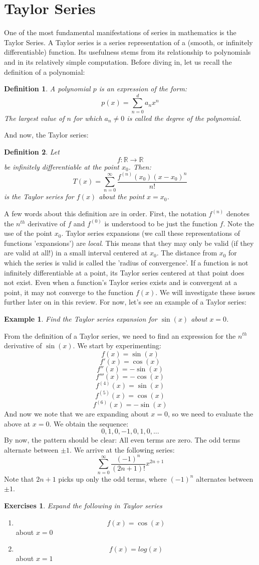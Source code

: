 \documentclass[12pt,a4paper]{article} %
\newtheorem{defn}{Definition}
\newtheorem{example}{Example}
\newtheorem{exer}{Exercises}
\begin{document}
\section{Taylor Series}
One of the most fundamental manifestations of series in mathematics is the Taylor Series.  A Taylor series is a series representation of a (smooth, or infinitely differentiable) function.  Its usefulness stems from its relationship to polynomials and in its relatively simple computation.  Before diving in, let us recall the definition of a polynomial:
\begin{defn}
A polynomial $p$ is an expression of the form:
$$p(x) = \sum_{n=0}^d a_n x^n$$
The largest value of $n$ for which $a_n\neq 0$ is called the \emph{degree} of the polynomial.
\end{defn}
And now, the Taylor series:
\begin{defn}
Let $$f:\mathbb{R}\rightarrow\mathbb{R}$$ be infinitely differentiable at the point $x_0$.  Then:
$$T(x)=\sum_{n=0}^\infty \frac{f^{(n)}(x_0)(x-x_0)^n}{n!}$$
is the Taylor series for $f(x)$ about the point $x=x_0$.  
\end{defn}
A few words about this definition are in order.  First, the notation $f^{(n)}$ denotes the $n^{th}$ derivative of $f$ and $f^{(0)}$ is understood to be just the function $f$.  Note the use of the point $x_0$.  Taylor series expansions (we call these representations of functions 'expansions') are \emph{local}.  This means that they may only be valid (if they are valid at all!) in a small interval centered at $x_0$.  The distance from $x_0$ for which the series is valid is called the 'radius of convergence'. If a function is not infinitely differentiable at a point, its Taylor series centered at that point does not exist.  Even when a function's Taylor series exists and is convergent at a point, it may not converge to the function $f(x)$.  We will investigate these issues further later on in this review.  For now, let's see an example of a Taylor series:
\begin{example}
Find the Taylor series expansion for $\sin(x)$ about $x=0$.
\end{example}
From the definition of a Taylor series, we need to find an expression for the $n^{th}$ derivative of $\sin(x)$.  We start by experimenting:
$$f(x) = \sin(x)$$
$$f'(x) = \cos(x)$$
$$f''(x) = -\sin(x)$$
$$f'''(x) = -\cos(x)$$
$$f^{(4)}(x) =\sin(x)$$
$$f^{(5)}(x) = \cos(x)$$
$$f^{(6)}(x) = -\sin(x)$$
And now we note that we are expanding about $x=0$, so we need to evaluate the above at $x=0$.  We obtain the sequence:
$$0,1,0,-1,0,1,0,...$$
By now, the pattern should be clear: All even terms are zero.  The odd terms alternate between $\pm1$. We arrive at the following series:
$$\sum_{n=0}^\infty \frac{(-1)^n}{(2n+1)!}x^{2n+1}$$
Note that $2n+1$ picks up only the odd terms, where $(-1)^n$ alternates between $\pm1$.  
\begin{exer}
Expand the following in Taylor series
\end{exer}
\begin{enumerate}
\item $$f(x) = \cos(x)$$ about $x=0$
\item $$f(x) = log(x)$$ about $x=1$
\end{enumerate}
\end{document}
